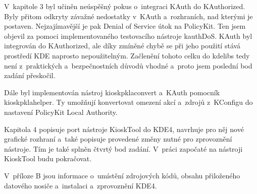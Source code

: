 V~kapitole 3 byl učiněn neúspěšný pokus o~integraci KAuth do KAuthorized. Byly přitom odkryty závažné nedostatky v~KAuth a~rozhraních, nad kterými je postaven. Nejzajímavější je pak Denial of Service útok na PolicyKit. Ten jsem objevil za pomoci implementovaného testovacího nástroje kauthDoS. KAuth byl integrován do KAuthorized, ale díky zmíněné chybě se při jeho použití stává prostředí KDE naprosto nepoužitelným. Začlenění tohoto celku do kdelibs tedy není z~praktických a~bezpečnostních důvodů vhodné a~proto jsem poslední bod zadání přeskočil.

Dále byl implementován nástroj kioskpklaconvert a~KAuth pomocník kioskpklahelper. Ty umožňují konvertovat omezení akcí a~zdrojů z~KConfigu do nastavení PolicyKit Local Authority.

Kapitola 4 popisuje port nástroje KioskTool do KDE4, navrhuje pro něj nové grafické rozhraní a~také popisuje provedené změny nutné pro zprovoznění nástroje. Tím je také splněn čtvrtý bod zadání. V~práci započaté na nástroji KioskTool budu pokračovat.

V~příloze B jsou informace o~umístění zdrojových kódů, obsahu přiloženého datového nosiče a~instalaci a~zprovoznění KDE4.

\appendix
